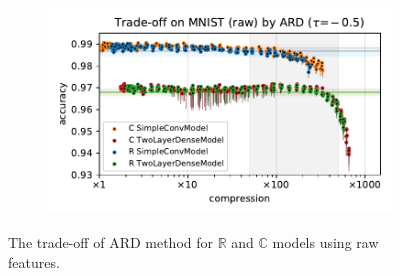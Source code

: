 \documentclass[a4paper,10pt,twocolumn]{article}
\newcommand{\real}{\mathbb{R}}
\newcommand{\cplx}{\mathbb{C}}
\begin{document}
\begin{figure}[b]
\begin{subfigure}[b]{0.5\columnwidth}
  \end{subfigure}%
  \begin{subfigure}[b]{0.5\columnwidth}
    \centering
    \includegraphics[width=\linewidth]{figure__mnist-like__trade-off/appendix__ARD__mnist__raw__-0.5.pdf}
  \end{subfigure}
  \caption{%
    The trade-off of ARD method for $\real$ and $\cplx$ models using raw features.
  }
  \label{fig:appendix__mnist-like__trade-off__ARD__raw}
\end{figure}
\end{document}
